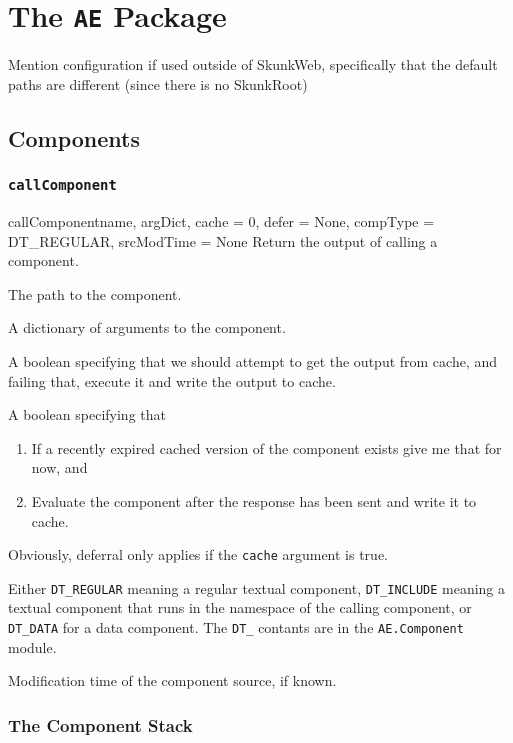 \chapter{The \texttt{AE} Package}
\label{aelib}
Mention configuration if used outside of SkunkWeb, specifically that
the default paths are different (since there is no SkunkRoot) 
\section{Components}
\subsection{\texttt{callComponent}}
\begin{funcdesc}{callComponent}{name, argDict, cache = 0,
                    defer = None, compType = DT_REGULAR,
                    srcModTime = None}
Return the output of calling a component.
\begin{argdesc}
\item[name] The path to the component.
\item[argDict] A dictionary of arguments to the component.
\item[cache] A boolean specifying that we should attempt to get the
output from cache, and failing that, execute it and write the output
to cache.
\item[defer] A boolean specifying that 
\begin{enumerate}
\item If a recently expired cached version of the component exists
give me that for now, and
\item Evaluate the component after the response has been sent and
write it to cache.
\end{enumerate}
Obviously, deferral only applies if the \texttt{cache} argument is
true.
\item[compType] \label{dtscore} Either \texttt{DT_REGULAR} meaning a
regular textual 
component, \texttt{DT_INCLUDE} meaning a textual component that runs in the
namespace of the calling component, or \texttt{DT\_DATA} for a data
component.  The \texttt{DT\_} 
contants are in the \verb!AE.Component! module.
\item[srcModTime] Modification time of the component source, if known.
\end{argdesc}
\end{funcdesc}

\subsection{The Component Stack}

